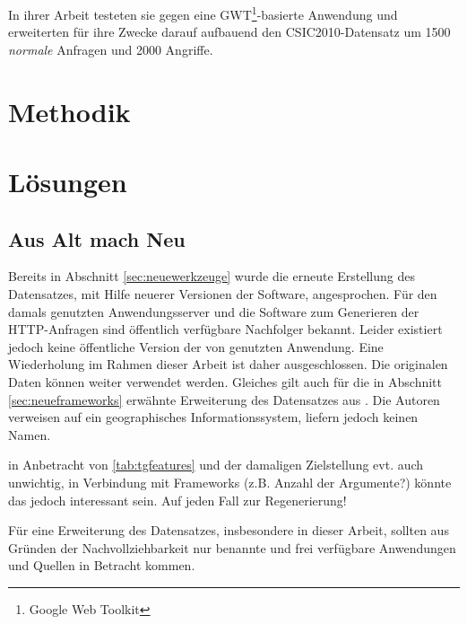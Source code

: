 In ihrer Arbeit testeten sie gegen eine GWT\footnote{Google Web Toolkit}-basierte Anwendung und erweiterten für ihre Zwecke darauf aufbauend den CSIC2010-Datensatz um 1500 \emph{normale} Anfragen und 2000 Angriffe.



\section{Methodik}


\section{Lösungen}

\subsection{Aus Alt mach Neu}
\label{sec:lsgalt}
Bereits in Abschnitt \ref{sec:neuewerkzeuge} wurde die erneute Erstellung des Datensatzes, mit Hilfe neuerer Versionen der Software, angesprochen. Für den damals genutzten Anwendungsserver und die Software zum Generieren der HTTP-Anfragen sind öffentlich verfügbare Nachfolger bekannt. Leider existiert jedoch keine öffentliche Version der von \cite{Giménez2015} genutzten Anwendung. Eine Wiederholung im Rahmen dieser Arbeit ist daher ausgeschlossen. Die originalen Daten können weiter verwendet werden. Gleiches gilt auch für die in Abschnitt \ref{sec:neueframeworks} erwähnte Erweiterung des Datensatzes aus \cite{kozik2019}. Die Autoren verweisen auf ein geographisches Informationssystem, liefern jedoch keinen Namen.\\

\begin{neu}
  in Anbetracht von \ref{tab:tgfeatures} und der damaligen Zielstellung evt. auch unwichtig, in Verbindung mit Frameworks (z.B. Anzahl der Argumente?) könnte das jedoch interessant sein. Auf jeden Fall zur Regenerierung!
\end{neu}

Für eine Erweiterung des Datensatzes, insbesondere in dieser Arbeit, sollten aus Gründen der Nachvollziehbarkeit nur benannte und frei verfügbare Anwendungen und Quellen in Betracht kommen. 

